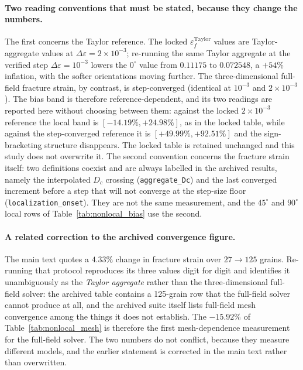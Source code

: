 \documentclass[11pt,a4paper,twocolumn]{article}
\providecommand{\ang}[1]{\ensuremath{#1^{\circ}}}
\begin{document}
\paragraph{Two reading conventions that must be stated, because they change the numbers.} The first concerns the
Taylor reference. The locked $\varepsilon_f^{\mathrm{Taylor}}$ values are Taylor-aggregate values at
$\Delta\varepsilon = 2\times10^{-3}$; re-running the same Taylor aggregate at the verified step
$\Delta\varepsilon = 10^{-3}$ lowers the $\ang{0}$ value from $0.11175$ to $0.072548$, a $+54\%$ inflation, with
the softer orientations moving further. The three-dimensional full-field fracture strain, by contrast, is
step-converged (identical at $10^{-3}$ and $2\times10^{-3}$). The bias band is therefore reference-dependent,
and its two readings are reported here without choosing between them: against the locked $2\times10^{-3}$
reference the local band is $[-14.19\%, +24.98\%]$, as in the locked table, while against the step-converged
reference it is $[+49.99\%, +92.51\%]$ and the sign-bracketing structure disappears. The locked table is
retained unchanged and this study does not overwrite it. The second convention concerns the fracture strain
itself: two definitions coexist and are always labelled in the archived results, namely the interpolated $D_c$
crossing (\texttt{aggregate\_Dc}) and the last converged increment before a step that will not converge at the
step-size floor (\texttt{localization\_onset}). They are not the same measurement, and the $\ang{45}$ and
$\ang{90}$ local rows of Table~\ref{tab:nonlocal_bias} use the second.

\paragraph{A related correction to the archived convergence figure.} The main text quotes a $4.33\%$ change in
fracture strain over $27 \to 125$ grains. Re-running that protocol reproduces its three values digit for digit
and identifies it unambiguously as the \emph{Taylor aggregate} rather than the three-dimensional full-field
solver: the archived table contains a 125-grain row that the full-field solver cannot produce at all, and the
archived suite itself lists full-field mesh convergence among the things it does not establish. The $-15.92\%$
of Table~\ref{tab:nonlocal_mesh} is therefore the first mesh-dependence measurement for the full-field solver.
The two numbers do not conflict, because they measure different models, and the earlier statement is corrected
in the main text rather than overwritten.
\end{document}
